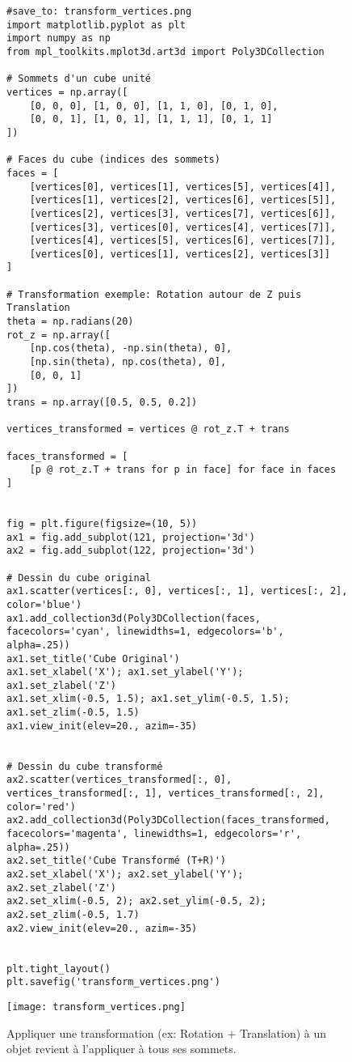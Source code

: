 \documentclass{article}
\begin{document}
\begin{figure}[H]
    \centering
    \begin{verbatim}
#save_to: transform_vertices.png
import matplotlib.pyplot as plt
import numpy as np
from mpl_toolkits.mplot3d.art3d import Poly3DCollection

# Sommets d'un cube unité
vertices = np.array([
    [0, 0, 0], [1, 0, 0], [1, 1, 0], [0, 1, 0],
    [0, 0, 1], [1, 0, 1], [1, 1, 1], [0, 1, 1]
])

# Faces du cube (indices des sommets)
faces = [
    [vertices[0], vertices[1], vertices[5], vertices[4]],
    [vertices[1], vertices[2], vertices[6], vertices[5]],
    [vertices[2], vertices[3], vertices[7], vertices[6]],
    [vertices[3], vertices[0], vertices[4], vertices[7]],
    [vertices[4], vertices[5], vertices[6], vertices[7]],
    [vertices[0], vertices[1], vertices[2], vertices[3]]
]

# Transformation exemple: Rotation autour de Z puis Translation
theta = np.radians(20)
rot_z = np.array([
    [np.cos(theta), -np.sin(theta), 0],
    [np.sin(theta), np.cos(theta), 0],
    [0, 0, 1]
])
trans = np.array([0.5, 0.5, 0.2])

vertices_transformed = vertices @ rot_z.T + trans

faces_transformed = [
    [p @ rot_z.T + trans for p in face] for face in faces
]


fig = plt.figure(figsize=(10, 5))
ax1 = fig.add_subplot(121, projection='3d')
ax2 = fig.add_subplot(122, projection='3d')

# Dessin du cube original
ax1.scatter(vertices[:, 0], vertices[:, 1], vertices[:, 2], color='blue')
ax1.add_collection3d(Poly3DCollection(faces, facecolors='cyan', linewidths=1, edgecolors='b', alpha=.25))
ax1.set_title('Cube Original')
ax1.set_xlabel('X'); ax1.set_ylabel('Y'); ax1.set_zlabel('Z')
ax1.set_xlim(-0.5, 1.5); ax1.set_ylim(-0.5, 1.5); ax1.set_zlim(-0.5, 1.5)
ax1.view_init(elev=20., azim=-35)


# Dessin du cube transformé
ax2.scatter(vertices_transformed[:, 0], vertices_transformed[:, 1], vertices_transformed[:, 2], color='red')
ax2.add_collection3d(Poly3DCollection(faces_transformed, facecolors='magenta', linewidths=1, edgecolors='r', alpha=.25))
ax2.set_title('Cube Transformé (T+R)')
ax2.set_xlabel('X'); ax2.set_ylabel('Y'); ax2.set_zlabel('Z')
ax2.set_xlim(-0.5, 2); ax2.set_ylim(-0.5, 2); ax2.set_zlim(-0.5, 1.7)
ax2.view_init(elev=20., azim=-35)


plt.tight_layout()
plt.savefig('transform_vertices.png')
    \end{verbatim}
    \texttt{[image: transform\_vertices.png]}
    \caption{Appliquer une transformation (ex: Rotation + Translation) à un objet revient à l'appliquer à tous ses sommets.}
    \label{fig:transform_vertices}
\end{figure}
\end{document}
